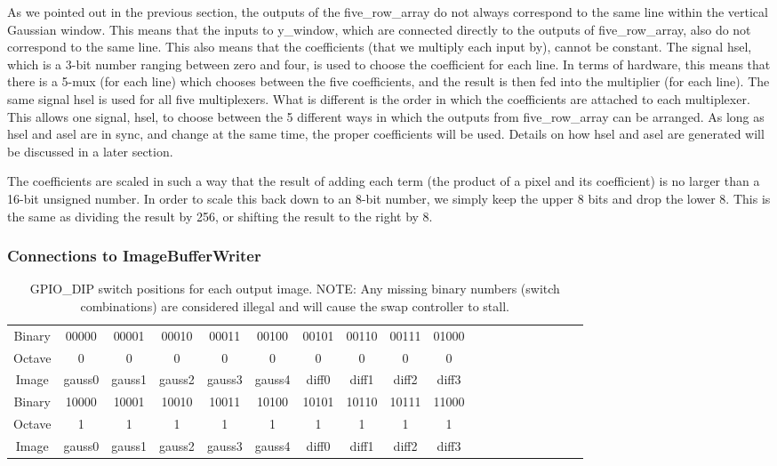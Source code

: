 As we pointed out in the previous section, the outputs of the five\_row\_array do 
not always correspond to the same line within the vertical Gaussian window. This 
means that the inputs to y\_window, which are connected directly to the outputs 
of five\_row\_array, also do not correspond to the same line. This also means that 
the coefficients (that we multiply each input by), cannot be constant. The 
signal hsel, which is a 3-bit number ranging between zero and four, is used to 
choose the coefficient for each line. In terms of hardware, this means that 
there is a 5-mux (for each line) which chooses between the five coefficients, 
and the result is then fed into the multiplier (for each line). The same signal 
hsel is used for all five multiplexers. What is different is the order in which 
the coefficients are attached to each multiplexer. This allows one signal, hsel, 
to choose between the 5 different ways in which the outputs from five\_row\_array 
can be arranged. As long as hsel and asel are in sync, and change at the same 
time, the proper coefficients will be used. Details on how hsel and asel are 
generated will be discussed in a later section.

The coefficients are scaled in such a way that the result of adding each term 
(the product of a pixel and its coefficient) is no larger than a 16-bit unsigned 
number. In order to scale this back down to an 8-bit number, we simply keep the 
upper 8 bits and drop the lower 8. This is the same as dividing the result by 
256, or shifting the result to the right by 8.

\subsubsection{Connections to ImageBufferWriter}

\begin{table}


    \begingroup
    \tiny
\begin{tabular}{ c | c | c | c | c | c | c | c | c | c | c | c | c | c | c | c | c | c | c } 
Binary & 00000 & 00001 & 00010 & 00011 & 00100 & 00101 & 00110 & 00111 & 01000 \\ 
Octave & 0 & 0 & 0 & 0 & 0 & 0 & 0 & 0 & 0 \\
Image & gauss0 & gauss1 & gauss2 & gauss3 & gauss4 & diff0 & diff1 & diff2 & diff3 \\ \toprule
Binary & 10000 & 10001 & 10010 & 10011 & 10100 & 10101 & 10110 & 10111 & 11000 \\
Octave & 1 & 1 & 1 & 1 & 1 & 1 & 1 & 1 & 1 \\
Image & gauss0 & gauss1 & gauss2 & gauss3 & gauss4 & diff0 & diff1 & diff2 & diff3 \\
\end{tabular}
\endgroup 
    \caption{ GPIO\_DIP switch positions for each output image. NOTE: Any missing binary numbers (switch combinations) are considered illegal and will cause the swap controller to stall.} \label{wrap-tab:1} 
\end{table}


